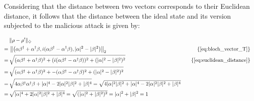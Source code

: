 Considering that the distance between two vectors corresponds to their Euclidean distance, it follows that the distance between the ideal state and its version subjected to the malicious attack is given by:

\begin{equation}
  \begin{split}
  & \lVert \rho-\rho' \rVert_{\diamondsuit} \\
   = \hspace{2pt}&    \left\lVert  \left(\alpha \beta^{\dag} + \alpha^{\dag} \beta , i(\alpha \beta^{\dag} - \alpha^{\dag} \beta),  |\alpha|^{2} - |\beta|^{2} \right)  \right\rVert_{2} \hspace{150pt} & \{\text{\autoref{eq:bloch_vector_T}}\}\\
   = \hspace{2pt}& \sqrt{(\alpha \beta^{\dag} + \alpha^{\dag} \beta)^{2} + (i(\alpha \beta^{\dag} - \alpha^{\dag} \beta))^{2} + (|\alpha|^{2} - |\beta|^{2})^{2}} & \{\text{\autoref{eq:euclidean_distance}}\}\\
   =  \hspace{2pt}& \sqrt{(\alpha \beta^{\dag} + \alpha^{\dag} \beta)^{2} + -(\alpha \beta^{\dag} - \alpha^{\dag} \beta)^{2} + (|\alpha|^{2} - |\beta|^{2})^{2}} \\
   =  \hspace{2pt}&  \sqrt{ 4\alpha \beta^{\dag} \alpha^{\dag} \beta + |\alpha|^{4} - 2|\alpha|^{2}|\beta|^{2} + |\beta|^{4}}= \sqrt{ 4|\alpha|^{2}|\beta|^{2} + |\alpha|^{4} - 2|\alpha|^{2}|\beta|^{2} + |\beta|^{4}} \\
   = \hspace{2pt}&  \sqrt{ |\alpha|^{4} + 2|\alpha|^{2}|\beta|^{2} + |\beta|^{4}} = \sqrt{(|\alpha|^{2} + |\beta|^{2})^{2}} = |\alpha|^{2} + |\beta|^{2} = 1
\end{split}
\end{equation}

